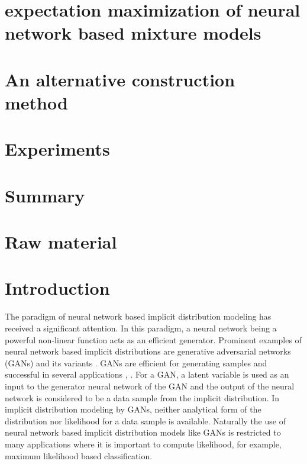 

\section{expectation maximization of neural network based mixture models}

\section{An alternative construction method}

\section{Experiments}


\section{Summary}

\section{Raw material}
\section{Introduction}

The paradigm of neural network based implicit distribution
modeling has received a significant attention. In this paradigm, a neural network being a powerful non-linear function acts as an efficient generator. Prominent examples of neural network based implicit distributions are generative adversarial networks (GANs) \cite{NIPS2014_5423} and its
variants \cite{NIPS2016_6125,
  2018arXiv180508318Z, salimans2018improving}. GANs are efficient for generating samples and successful in several applications \cite{ledig2017photo}, \cite{NIPS2016_6125}. For a GAN, a latent variable is used as
an input to the generator neural network of the GAN and the output of the
neural network is considered to be a data sample from the implicit
distribution.  In implicit distribution modeling by GANs, neither
analytical form of the distribution nor likelihood for a data sample
is available. Naturally the use of neural network based implicit distribution models like GANs is restricted to many applications where it is important to compute likelihood, for example, maximum likelihood based classification.

